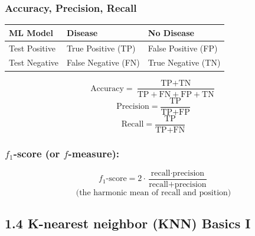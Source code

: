\documentclass{article}
\begin{document}
\subsubsection*{Accuracy, Precision, Recall}
\begin{center}
    \begin{tabular}{|l|l|l|}
        \hline
        \rowcolor[HTML]{3531FF} 
        {\color[HTML]{FFFFFF} ML Model}       & {\color[HTML]{FFFFFF} Disease} & {\color[HTML]{FFFFFF} No Disease} \\ \hline
        \cellcolor[HTML]{67FD9A}Test Positive & True Positive (TP)             & False Positive (FP)               \\ \hline
        \cellcolor[HTML]{FFCCC9}Test Negative & False Negative (FN)            & True Negative (TN)                \\ \hline
    \end{tabular}
\end{center}
\[\text{Accuracy} = \frac{\text{TP} + \text{TN}}{\text{TP} + \text{FN} + \text{FP} + \text{TN}}\]
\[\text{Precision} = \frac{\text{TP}}{\text{TP} + \text{FP}}\]
\[\text{Recall} = \frac{\text{TP}}{\text{TP} + \text{FN}}\]
\subsubsection*{$f_1$-score (or $f$-measure):}
\[f_1\text{-score} = 2 \cdot \frac{\text{recall}\cdot\text{precision}}{\text{recall} + \text{precision}}\]
\[\text{(the harmonic mean of recall and position)}\]

\subsection*{1.4 K-nearest neighbor (KNN) Basics I}
\end{document}
